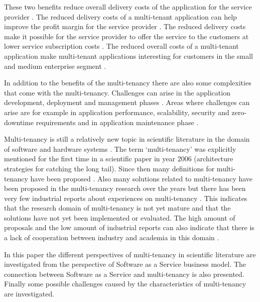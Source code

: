 \documentclass[conference]{sasmoota2017}
\begin{document}
These two benefits reduce overall delivery costs of the application for the service provider \cite{Bezemer:2010:MaintenanceDream}. The reduced delivery costs of a multi-tenant application can help improve the profit margin for the service provider \cite{Guo:2007:FrameworkForNative}. The reduced delivery costs make it possible for the service provider to offer the service to the customers at lower service subscription costs \cite{Guo:2007:FrameworkForNative}. The reduced overall costs of a multi-tenant application make multi-tenant applications interesting for customers in the small and medium enterprise segment \cite{Bezemer:2010:MaintenanceDream}.

In addition to the benefits of the multi-tenancy there are also some complexities that come with the multi-tenancy. Challenges can arise in the application development, deployment and management phases \cite{Guo:2007:FrameworkForNative}. Areas where challenges can arise are for example in application performance, scalability, security and zero-downtime requirements and in application maintenance phase \cite{Bezemer:2010:MaintenanceDream}. 

Multi-tenancy is still a relatively new topic in scientific literature in the domain of software and hardware systems \cite{Kabbedijk2015:Defining}. The term ‘multi-tenancy’ was explicitly mentioned for the first time in a scientific paper in year 2006 \cite{Kabbedijk2015:Defining} (architecture strategies for catching the long tail). Since then many definitions for multi-tenancy have been proposed \cite{Kabbedijk2015:Defining}. Also many solutions related to multi-tenancy have been proposed in the multi-tenancy research over the years but there has been very few industrial reports about experiences on multi-tenancy \cite{Kabbedijk2015:Defining}. This indicates that the research domain of multi-tenancy is not yet mature and that the solutions have not yet been implemented or evaluated. The high amount of proposals and the low amount of industrial reports can also indicate that there is a lack of cooperation between industry and academia in this domain \cite{Kabbedijk2015:Defining}.

In this paper the different perspectives of multi-tenancy in scientific literature are investigated from the perspective of Software as a Service business model. The connection between Software as a Service and multi-tenancy is also presented. Finally some possible challenges caused by the characteristics of multi-tenancy are investigated.
\end{document}
